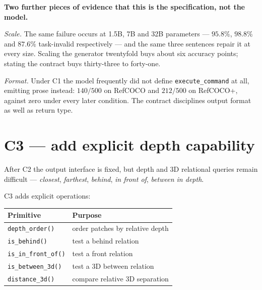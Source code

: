 \documentclass[11pt,a4paper]{article}
\begin{document}
\begin{callout}
\textbf{Two further pieces of evidence that this is the specification, not the model.}

\smallskip
\emph{Scale.} The same failure occurs at 1.5B, 7B and 32B parameters --- $95.8\%$,
$98.8\%$ and $87.6\%$ task-invalid respectively --- and the same three sentences repair
it at every size. Scaling the generator twentyfold buys about six accuracy points;
stating the contract buys thirty-three to forty-one.

\smallskip
\emph{Format.} Under C1 the model frequently did not define \texttt{execute\_command}
at all, emitting prose instead: $140/500$ on RefCOCO and $212/500$ on RefCOCO+,
against zero under every later condition. The contract disciplines output format as
well as return type.
\end{callout}

\section{C3 --- add explicit depth capability}

After C2 the output interface is fixed, but depth and 3D relational queries remain
difficult --- \emph{closest}, \emph{farthest}, \emph{behind}, \emph{in front of},
\emph{between in depth}.

\begin{center}
\end{center}

C3 adds explicit operations:

\begin{center}
\begin{tabular}{@{}ll@{}}
\toprule
\textbf{Primitive} & \textbf{Purpose} \\
\midrule
\texttt{depth\_order()}   & order patches by relative depth \\
\texttt{is\_behind()}     & test a behind relation \\
\texttt{is\_in\_front\_of()} & test a front relation \\
\texttt{is\_between\_3d()} & test a 3D between relation \\
\texttt{distance\_3d()}   & compare relative 3D separation \\
\bottomrule
\end{tabular}
\end{center}
\end{document}
